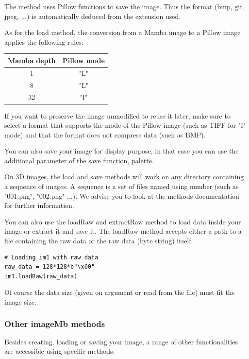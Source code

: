 \documentclass[a4paper,10pt,oneside]{article}
\begin{document}
The method uses Pillow functions to save the image. Thus the format (bmp, gif, 
jpeg, ...) is automatically deduced from the extension used.

As for the load method, the conversion from a Mamba image to a Pillow image
applies the following rules:

\begin{center}
\begin{tabular}{|c|c|}
  \hline
  Mamba depth & Pillow mode \\
  \hline
  1 & "L"\\
  8 & "L"\\
  32 & "I"\\
  \hline
\end{tabular}
\end{center}

If you want to preserve the image unmodified to reuse it later, make sure to
select a format that supports the mode of the Pillow image (such as TIFF for
"I" mode) and that the format does not compress data (such as BMP).

You can also save your image for display purpose, in that case you can use the
additional parameter of the save function, palette.

On 3D images, the load and save methods will work on any directory containing
a sequence of images. A sequence is a set of files named using number (such
as "001.png", "002.png" ...). We advise you to look at the methods documentation
for further information.

You can also use the loadRaw and extractRaw method to load data inside your
image or extract it and save it. The loadRaw method accepts either a path to a
file containing the raw data or the raw data (byte string) itself.

\lstset{language=Python}
\begin{lstlisting}
# Loading im1 with raw data
raw_data = 128*128*b"\x00"
im1.loadRaw(raw_data)
\end{lstlisting}

Of course the data size (given on argument or read from the file) must fit the
image size.

\subsubsection{Other imageMb methods}

Besides creating, loading or saving your image, a range of other functionalities
are accessible using specific methods.
\end{document}
